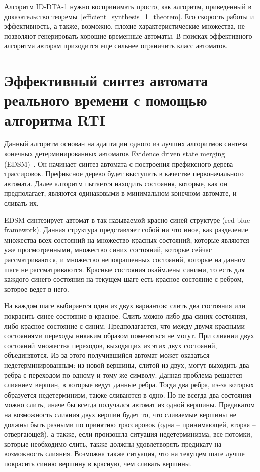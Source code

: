 \documentclass[times,specification,annotation]{itmo-student-thesis}
\begin{document}
Алгоритм ID-DTA-1 нужно воспринимать просто, как алгоритм, приведенный в доказательство теоремы~\ref{efficient_synthesis_1_theorem}. Его скорость работы и эффективность, а также, возможно,
плохие характеристические множества, не позволяют генерировать хорошие временные автоматы. В поисках эффективного алгоритма авторам приходится еще сильнее ограничить класс автоматов.

\section{Эффективный синтез автомата реального времени с помощью алгоритма RTI}

Данный алгоритм основан на адаптации одного из лучших алгоритмов синтеза конечных детерминированных автоматов Evidence driven state merging (EDSM)~\cite{state-merging-dfa}. 
Он начинает синтез автомата с построения префиксного дерева трассировок. Префиксное дерево будет выступать в качестве первоначального автомата.
Далее алгоритм пытается находить состояния, которые, как он предполагает, являются одинаковыми в минимальном конечном автомате, и сливать их.

EDSM синтезирует автомат в так называемой красно-синей структуре (red-blue framework). Данная структура представляет собой ни что иное, как разделение множества всех состояний на
множество красных состояний, которые являются уже просмотренными, множество синих состояний, которые сейчас рассматриваются, и множество непокрашенных
состояний, которые на данном шаге не рассматриваются. Красные состояния окаймлены синими, то есть
для каждого синего состояния на текущем шаге есть красное состояние с ребром, которое ведет в него.

На каждом шаге выбирается один из двух вариантов: слить два состояния или покрасить синее состояние в красное. Слить можно либо два синих состояния,
либо красное состояние с синим. Предполагается, что между двумя красными состояниями переходы никаким образом поменяться не могут. При слиянии двух состояний 
множества переходов, выходящих из этих двух состояний, объединяются. Из-за этого получившийся автомат может оказаться недетерминированным: из новой вершины,
слитой из двух, могут выходить два ребра с переходом по одному и тому же символу. Данная проблема решается слиянием вершин, в которые ведут данные ребра. Тогда
два ребра, из-за которых образуется недетерминизм, также сливаются в одно. Но не всегда два состояния можно слить, иначе бы всегда получался автомат из одной вершины.
Предикатом на возможность слияния двух вершин будет то, что сливаемые вершины не должны быть разными по принятию трассировок (одна -- принимающей, вторая -- отвергающей), а также, 
если произошла ситуация недетерминизма, все потомки, которые необходимо слить, также должны удовлетворять предикату на возможность слияния.
Возможна также ситуация, что на текущем шаге лучше покрасить синию вершину в красную, чем сливать вершины.
\end{document}
